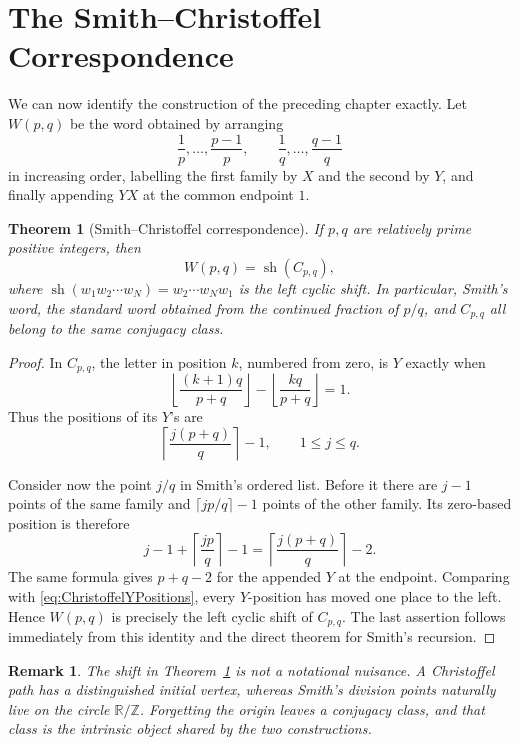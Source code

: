 \documentclass{book}
\newtheorem{remark}[definition]{Remark}
\newtheorem{theorem}[definition]{Theorem}
\begin{document}
\section{The Smith--Christoffel Correspondence}

We can now identify the construction of the preceding chapter exactly.
Let \(W(p,q)\) be the word obtained by arranging
\[
  \frac1p,\ldots,\frac{p-1}{p},
  \qquad
  \frac1q,\ldots,\frac{q-1}{q}
\]
in increasing order, labelling the first family by \(X\) and the second by
\(Y\), and finally appending \(YX\) at the common endpoint \(1\).

\begin{theorem}[Smith--Christoffel correspondence]
  \label{theorem:SmithChristoffelCorrespondence}
  If \(p,q\) are relatively prime positive integers, then
  \[
    W(p,q)=\operatorname{sh}(C_{p,q}),
  \]
  where \(\operatorname{sh}(w_1w_2\cdots w_N)=w_2\cdots w_Nw_1\) is the
  left cyclic shift.  In particular, Smith's word, the standard word
  obtained from the continued fraction of \(p/q\), and \(C_{p,q}\) all
  belong to the same conjugacy class.
\end{theorem}
\begin{proof}
  In \(C_{p,q}\), the letter in position \(k\), numbered from zero, is
  \(Y\) exactly when
  \[
    \left\lfloor\frac{(k+1)q}{p+q}\right\rfloor
    -\left\lfloor\frac{kq}{p+q}\right\rfloor=1.
  \]
  Thus the positions of its \(Y\)'s are
  \begin{equation}\label{eq:ChristoffelYPositions}
    \left\lceil\frac{j(p+q)}q\right\rceil-1,
    \qquad 1\leq j\leq q.
  \end{equation}

  Consider now the point \(j/q\) in Smith's ordered list.  Before it there
  are \(j-1\) points of the same family and
  \(\lceil jp/q\rceil-1\) points of the other family.  Its zero-based
  position is therefore
  \[
    j-1+\left\lceil\frac{jp}{q}\right\rceil-1
    =\left\lceil\frac{j(p+q)}q\right\rceil-2.
  \]
  The same formula gives \(p+q-2\) for the appended \(Y\) at the endpoint.
  Comparing with \eqref{eq:ChristoffelYPositions}, every \(Y\)-position
  has moved one place to the left.  Hence \(W(p,q)\) is precisely the left
  cyclic shift of \(C_{p,q}\).  The last assertion follows immediately
  from this identity and the direct theorem for Smith's recursion.
\end{proof}

\begin{remark}
  The shift in Theorem~\ref{theorem:SmithChristoffelCorrespondence} is not
  a notational nuisance.  A Christoffel path has a distinguished initial
  vertex, whereas Smith's division points naturally live on the circle
  \(\mathbb R/\mathbb Z\).  Forgetting the origin leaves a conjugacy class,
  and that class is the intrinsic object shared by the two constructions.
\end{remark}
\end{document}
